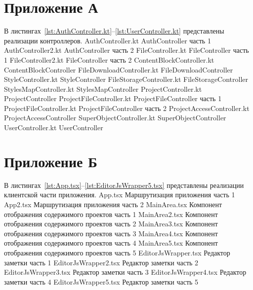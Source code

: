 \begin{appendices}
	\chapter{Приложение А}
	В листингах~\ref{lst:AuthController.kt}--\ref{lst:UserController.kt} представлены реализации контроллеров. 
		{AuthController.kt}
		{AuthController часть 1}
		{AuthController2.kt}
		{AuthController часть 2}
	\clearpage
		{FileController.kt}
		{FileController часть 1}
	\clearpage
		{FileController2.kt}
		{FileController часть 2}
		{ContentBlockController.kt}
		{ContentBlockController}
	\clearpage
		{FileDownloadController.kt}
		{FileDownloadController}
		{StyleController.kt}
		{StyleController}
	\clearpage
		{FileStorageController.kt}
		{FileStorageController}
		{StylesMapController.kt}
		{StylesMapController}
	\clearpage
		{ProjectController.kt}
		{ProjectController}
	\clearpage
		{ProjectFileController.kt}
		{ProjectFileController часть 1}
	\clearpage
		{ProjectFileController.kt}
		{ProjectFileController часть 2}
	\clearpage
		{ProjectAccessController.kt}
		{ProjectAccessController}
	\clearpage
		{SuperObjectController.kt}
		{SuperObjectController}
	\clearpage
		{UserController.kt}
		{UserController}

	\chapter{Приложение Б}
	В листингах~\ref{lst:App.tsx}--\ref{lst:EditorJsWrapper5.tsx} представлены реализации клиентской части приложения. 
		{App.tsx}
		{Маршрутизация приложения часть 1}
	\clearpage
		{App2.tsx}
		{Маршрутизация приложения часть 2}
	\clearpage
		{MainArea.tsx}
		{Компонент отображения содержимого проектов часть 1}
	\clearpage
		{MainArea2.tsx}
		{Компонент отображения содержимого проектов часть 2}
	\clearpage
		{MainArea3.tsx}
		{Компонент отображения содержимого проектов часть 3}
	\clearpage
		{MainArea4.tsx}
		{Компонент отображения содержимого проектов часть 4}
	\clearpage
		{MainArea5.tsx}
		{Компонент отображения содержимого проектов часть 5}
	\clearpage
		{EditorJsWrapper.tsx}
		{Редактор заметки часть 1}
	\clearpage
		{EditorJsWrapper2.tsx}
		{Редактор заметки часть 2}
	\clearpage
		{EditorJsWrapper3.tsx}
		{Редактор заметки часть 3}
	\clearpage
		{EditorJsWrapper4.tsx}
		{Редактор заметки часть 4}
	\clearpage
		{EditorJsWrapper5.tsx}
		{Редактор заметки часть 5}


\end{appendices}
